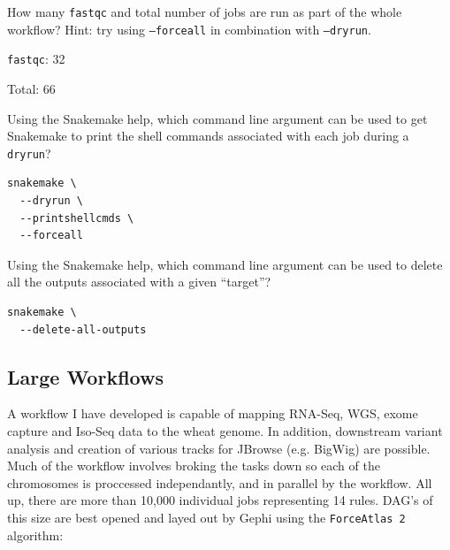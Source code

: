 \begin{questions}

How many \texttt{fastqc} and total number of jobs are run as part of the whole workflow?
Hint: try using \texttt{--forceall} in combination with \texttt{--dryrun}.

\begin{answer}

\texttt{fastqc}: 32

Total: 66

\end{answer}

Using the Snakemake help, which command line argument can be used to get Snakemake to print the shell commands associated with each job during a \texttt{dryrun}?

\begin{answer}

\begin{lstlisting}
snakemake \
  --dryrun \
  --printshellcmds \
  --forceall
\end{lstlisting}

\end{answer}

Using the Snakemake help, which command line argument can be used to delete all the outputs associated with a given ``target''?

\begin{answer}

\begin{lstlisting}
snakemake \
  --delete-all-outputs
\end{lstlisting}

\end{answer}

\end{questions}

\subsection{Large Workflows}

A workflow I have developed is capable of mapping RNA-Seq, WGS, exome capture and Iso-Seq data to the wheat genome.
In addition, downstream variant analysis and creation of various tracks for JBrowse (e.g. BigWig) are possible.
Much of the workflow involves broking the tasks down so each of the chromosomes is proccessed independantly, and in parallel by the workflow.
All up, there are more than 10,000 individual jobs representing 14 rules.
DAG's of this size are best opened and layed out by Gephi using the \texttt{ForceAtlas 2} algorithm:


